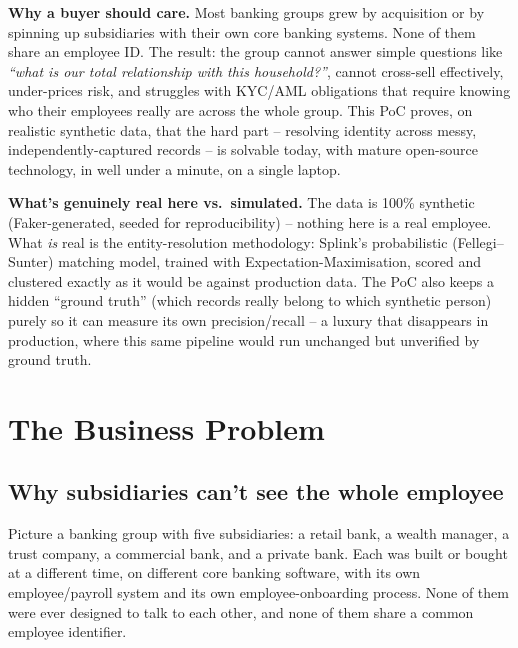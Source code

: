 \documentclass[11pt]{report}
\begin{document}
\begin{bizbox}
\textbf{Why a buyer should care.} Most banking groups grew by acquisition or by spinning up subsidiaries with their own core banking systems. None of them share an employee ID. The result: the group cannot answer simple questions like \emph{``what is our total relationship with this household?''}, cannot cross-sell effectively, under-prices risk, and struggles with KYC/AML obligations that require knowing who their employees really are across the whole group. This PoC proves, on realistic synthetic data, that the hard part -- resolving identity across messy, independently-captured records -- is solvable today, with mature open-source technology, in well under a minute, on a single laptop.
\end{bizbox}

\begin{engbox}
\textbf{What's genuinely real here vs.\ simulated.} The data is 100\% synthetic (Faker-generated, seeded for reproducibility) -- nothing here is a real employee. What \emph{is} real is the entity-resolution methodology: Splink's probabilistic (Fellegi--Sunter) matching model, trained with Expectation-Maximisation, scored and clustered exactly as it would be against production data. The PoC also keeps a hidden ``ground truth'' (which records really belong to which synthetic person) purely so it can measure its own precision/recall -- a luxury that disappears in production, where this same pipeline would run unchanged but unverified by ground truth.
\end{engbox}

\chapter{The Business Problem}

\section{Why subsidiaries can't see the whole employee}

Picture a banking group with five subsidiaries: a retail bank, a wealth manager, a trust company, a commercial bank, and a private bank. Each was built or bought at a different time, on different core banking software, with its own employee/payroll system and its own employee-onboarding process. None of them were ever designed to talk to each other, and none of them share a common employee identifier.
\end{document}
